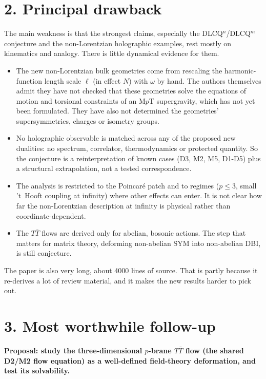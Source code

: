 \documentclass[11pt]{article}
\begin{document}
\section*{2. Principal drawback}
The main weakness is that the strongest claims, especially the DLCQ$^n$/DLCQ$^m$ conjecture and the non-Lorentzian holographic examples, rest mostly on kinematics and analogy. There is little dynamical evidence for them.
\begin{itemize}
\item The new non-Lorentzian bulk geometries come from rescaling the harmonic-function length scale $\ell$ (in effect $N$) with $\omega$ by hand. The authors themselves admit they have not checked that these geometries solve the equations of motion and torsional constraints of an M$p$T supergravity, which has not yet been formulated. They have also not determined the geometries' supersymmetries, charges or isometry groups.
\item No holographic observable is matched across any of the proposed new dualities: no spectrum, correlator, thermodynamics or protected quantity. So the conjecture is a reinterpretation of known cases (D3, M2, M5, D1-D5) plus a structural extrapolation, not a tested correspondence.
\item The analysis is restricted to the Poincar\'e patch and to regimes ($p\le 3$, small 't~Hooft coupling at infinity) where other effects can enter. It is not clear how far the non-Lorentzian description at infinity is physical rather than coordinate-dependent.
\item The $T\bar T$ flows are derived only for abelian, bosonic actions. The step that matters for matrix theory, deforming non-abelian SYM into non-abelian DBI, is still conjecture.
\end{itemize}
The paper is also very long, about 4000 lines of source. That is partly because it re-derives a lot of review material, and it makes the new results harder to pick out.

\section*{3. Most worthwhile follow-up}
\textbf{Proposal: study the three-dimensional $p$-brane $T\bar T$ flow (the shared D2/M2 flow equation) as a well-defined field-theory deformation, and test its solvability.}
\end{document}
